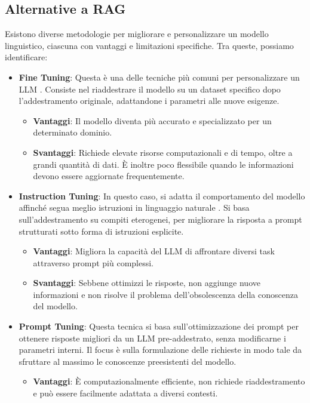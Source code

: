 \subsection{Alternative a RAG}
Esistono diverse metodologie per migliorare e personalizzare un modello linguistico, ciascuna con vantaggi e limitazioni specifiche. Tra queste, possiamo identificare:
\begin{itemize}
    \item \textbf{Fine Tuning}: Questa è una delle tecniche più comuni per personalizzare un LLM \cite{lu2024finetuninglargelanguagemodels}. Consiste nel riaddestrare il modello su un dataset specifico dopo l'addestramento originale, adattandone i parametri alle nuove esigenze.
        \begin{itemize}
            \item \textbf{Vantaggi}: Il modello diventa più accurato e specializzato per un determinato dominio.
            \item \textbf{Svantaggi}: Richiede elevate risorse computazionali e di tempo, oltre a grandi quantità di dati. È inoltre poco flessibile quando le informazioni devono essere aggiornate frequentemente.
        \end{itemize}
    \item \textbf{Instruction Tuning}: In questo caso, si adatta il comportamento del modello affinché segua meglio istruzioni in linguaggio naturale \cite{ouyang2022traininglanguagemodelsfollow}. Si basa sull'addestramento su compiti eterogenei, per migliorare la risposta a prompt strutturati sotto forma di istruzioni esplicite.
        \begin{itemize}
            \item \textbf{Vantaggi}: Migliora la capacità del LLM di affrontare diversi task attraverso prompt più complessi.
            \item \textbf{Svantaggi}: Sebbene ottimizzi le risposte, non aggiunge nuove informazioni e non risolve il problema dell'obsolescenza della conoscenza del modello.
        \end{itemize}
    \item \textbf{Prompt Tuning}: Questa tecnica si basa sull'ottimizzazione dei prompt per ottenere risposte migliori da un LLM pre-addestrato, senza modificarne i parametri interni. Il focus è sulla formulazione delle richieste in modo tale da sfruttare al massimo le conoscenze preesistenti del modello.
        \begin{itemize}
            \item \textbf{Vantaggi}: È computazionalmente efficiente, non richiede riaddestramento e può essere facilmente adattata a diversi contesti.

\end{itemize}
\end{itemize}
